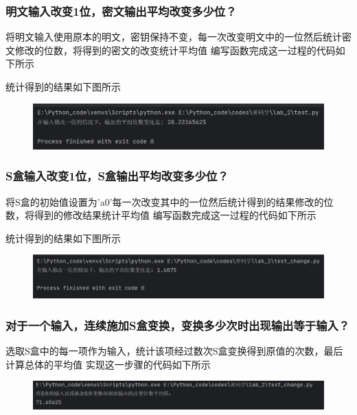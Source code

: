 \documentclass[a4paper,11pt,UTF8]{ctexart}
\newcommand{\bottomcaption}{%
\setlength{\abovecaptionskip}{6pt}%
\setlength{\belowcaptionskip}{6pt}%
\caption}
\newcommand{\xiaowuhao}{\fontsize{9pt}{\baselineskip}\selectfont}   %
\begin{document}
        \subsubsection{明文输入改变1位，密文输出平均改变多少位？}
            将明文输入使用原本的明文，密钥保持不变，每一次改变明文中的一位然后统计密文修改的位数，将得到的密文的改变统计平均值
            编写函数完成这一过程的代码如下所示
            
\newpage
            统计得到的结果如下图所示
            \begin{figure}[H]
                \centering
                \includegraphics[width=13cm]{change_m.png}
                \bottomcaption{\xiaowuhao{统计密文修改结果}}
            \end{figure}

        \subsubsection{S盒输入改变1位，S盒输出平均改变多少位？}
            将S盒的初始值设置为'a0'每一次改变其中的一位然后统计得到的结果修改的位数，将得到的修改结果统计平均值
            编写函数完成这一过程的代码如下所示
        
            统计得到的结果如下图所示
            \begin{figure}[H]
                \centering
                \includegraphics[width=13cm]{change_s.png}
                \bottomcaption{\xiaowuhao{统计密文修改结果}}
            \end{figure}
\newpage
        \subsubsection{对于一个输入，连续施加S盒变换，变换多少次时出现输出等于输入？}
            选取S盒中的每一项作为输入，统计该项经过数次S盒变换得到原值的次数，最后计算总体的平均值
            实现这一步骤的代码如下所示
            
            \begin{figure}[H]
                \centering
                \includegraphics[width=13cm]{s.png}
                \bottomcaption{\xiaowuhao{连续施加s盒结果}}
            \end{figure}
    
\end{document}
